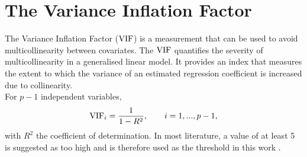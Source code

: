 \section{The Variance Inflation Factor}\label{sec:vif}
The Variance Inflation Factor ($\hbox{VIF}$) is a measurement that can be used to avoid multicollinearity between covariates. The $\hbox{VIF}$ quantifies the severity of multicollinearity in a generalised linear model. It provides an index that measures the extent to which the variance of an estimated regression coefficient is increased due to collinearity. \\
For $p-1$ independent variables, 
\begin{equation}
    \hbox{VIF}_i = \frac{1}{1-R^2},\hspace{20pt}i=1,...,p-1,
\end{equation}
with $R^2$ the coefficient of determination. In most literature, a value of at least 5 is suggested as too high and is therefore used as the threshold in this work \autocite[][]{craney2002model}.
\clearpage